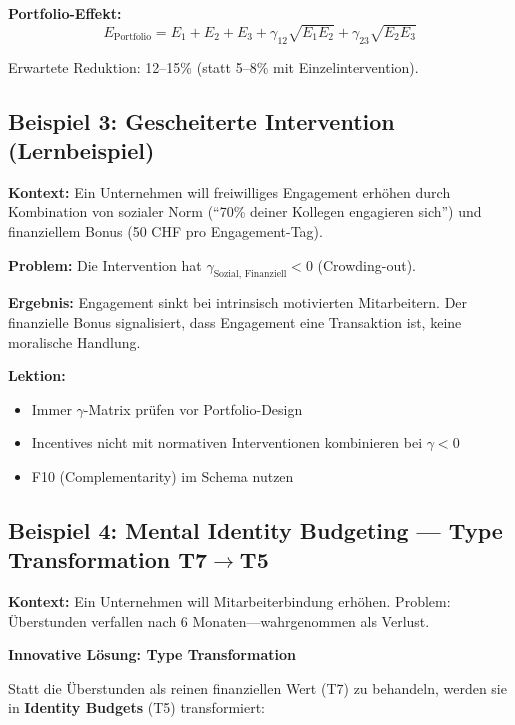 \textbf{Portfolio-Effekt:}
\begin{equation}
E_{\text{Portfolio}} = E_1 + E_2 + E_3 + \gamma_{12}\sqrt{E_1 E_2} + \gamma_{23}\sqrt{E_2 E_3}
\end{equation}

Erwartete Reduktion: 12--15\% (statt 5--8\% mit Einzelintervention).


\subsection{Beispiel 3: Gescheiterte Intervention (Lernbeispiel)}
\label{sec:17-example-failure}

\textbf{Kontext:} Ein Unternehmen will freiwilliges Engagement erhöhen durch Kombination von sozialer Norm (``70\% deiner Kollegen engagieren sich'') und finanziellem Bonus (50 CHF pro Engagement-Tag).

\textbf{Problem:} Die Intervention hat $\gamma_{\text{Sozial, Finanziell}} < 0$ (Crowding-out).

\textbf{Ergebnis:} Engagement sinkt bei intrinsisch motivierten Mitarbeitern. Der finanzielle Bonus signalisiert, dass Engagement eine Transaktion ist, keine moralische Handlung.

\textbf{Lektion:}
\begin{itemize}[nosep]
\item Immer $\gamma$-Matrix prüfen vor Portfolio-Design
\item Incentives nicht mit normativen Interventionen kombinieren bei $\gamma < 0$
\item F10 (Complementarity) im Schema nutzen
\end{itemize}


\subsection{Beispiel 4: Mental Identity Budgeting --- Type Transformation T7$\rightarrow$T5}
\label{sec:17-example-mental-budgets}

\textbf{Kontext:} Ein Unternehmen will Mitarbeiterbindung erhöhen. Problem: Überstunden verfallen nach 6 Monaten---wahrgenommen als Verlust.

\textbf{Innovative Lösung: Type Transformation}

Statt die Überstunden als reinen finanziellen Wert (T7) zu behandeln, werden sie in \textbf{Identity Budgets} (T5) transformiert:

